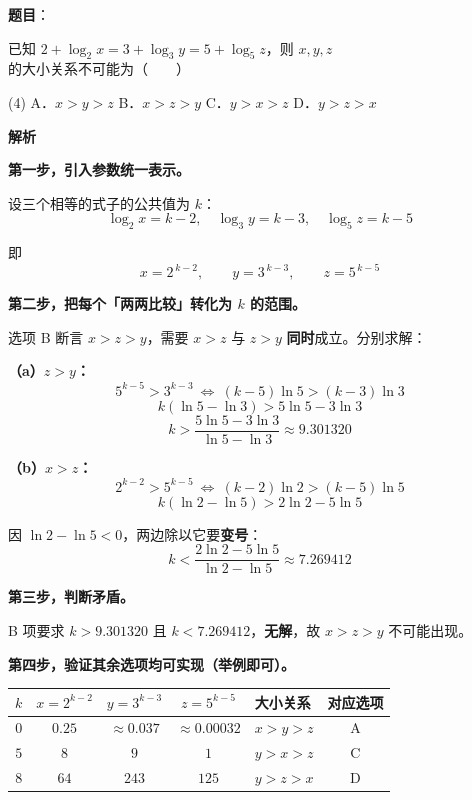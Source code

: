\begin{answer}

\textbf{题目}：

已知 $2+\log_2 x=3+\log_3 y=5+\log_5 z$，则 $x,y,z$ 的大小关系不可能为\mbox{（　　）}

\begin{gkopts}(4)
\task A．$x>y>z$
\task B．$x>z>y$
\task C．$y>x>z$
\task D．$y>z>x$
\end{gkopts}

\textbf{解析}

\textbf{第一步，引入参数统一表示。}

设三个相等的式子的公共值为 $k$：
\nopagebreak[4]
\[\log_2x=k-2,\quad \log_3y=k-3,\quad \log_5z=k-5\]

即
\nopagebreak[4]
\[x=2^{\,k-2},\qquad y=3^{\,k-3},\qquad z=5^{\,k-5}\]

\textbf{第二步，把每个「两两比较」转化为 $k$ 的范围。}

选项 B 断言 $x>z>y$，需要 $x>z$ 与 $z>y$ \textbf{同时}成立。分别求解：

\textbf{（a）$z>y$：}
\nopagebreak[4]
\[5^{k-5}>3^{k-3}\ \Longleftrightarrow\ (k-5)\ln5>(k-3)\ln3\]
\nopagebreak[4]
\[k(\ln5-\ln3)>5\ln5-3\ln3\]
\nopagebreak[4]
\[k>\frac{5\ln5-3\ln3}{\ln5-\ln3}\approx9.301320\]

\textbf{（b）$x>z$：}
\nopagebreak[4]
\[2^{k-2}>5^{k-5}\ \Longleftrightarrow\ (k-2)\ln2>(k-5)\ln5\]
\nopagebreak[4]
\[k(\ln2-\ln5)>2\ln2-5\ln5\]

因 $\ln2-\ln5<0$，两边除以它要\textbf{变号}：
\nopagebreak[4]
\[k<\frac{2\ln2-5\ln5}{\ln2-\ln5}\approx7.269412\]

\textbf{第三步，判断矛盾。}

B 项要求 $k>9.301320$ 且 $k<7.269412$，\textbf{无解}，故 $x>z>y$ 不可能出现。

\textbf{第四步，验证其余选项均可实现（举例即可）。}

\begin{center}
\begin{tabular}{cccclc}
\toprule
$k$ & $x=2^{k-2}$ & $y=3^{k-3}$ & $z=5^{k-5}$ & 大小关系 & 对应选项 \\
\midrule
$0$ & $0.25$ & $\approx0.037$ & $\approx0.00032$ & $x>y>z$ & A  \\
$5$ & $8$ & $9$ & $1$ & $y>x>z$ & C  \\
$8$ & $64$ & $243$ & $125$ & $y>z>x$ & D  \\
\bottomrule
\end{tabular}
\end{center}


\end{answer}
